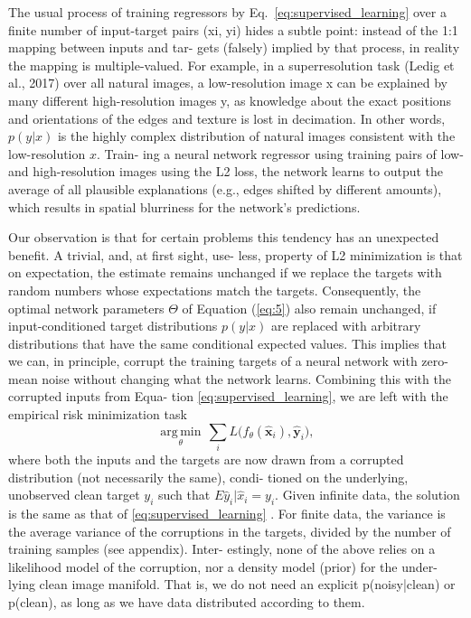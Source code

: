 The usual process of training regressors by
Eq.~\ref{eq:supervised_learning} over a finite number of input-target
pairs (xi, yi) hides a subtle point: instead of the 1:1 mapping
between inputs and tar- gets (falsely) implied by that process, in
reality the mapping is multiple-valued. For example, in a superresolution task
(Ledig et al., 2017) over all natural images, a low-resolution
image x can be explained by many different high-resolution
images y, as knowledge about the exact positions and orientations of the edges and texture is lost in decimation. In
other words, $p(y|x)$ is the highly complex distribution of
natural images consistent with the low-resolution $x$. Train-
ing a neural network regressor using training pairs of low-
and high-resolution images using the L2 loss, the network
learns to output the average of all plausible explanations
(e.g., edges shifted by different amounts), which results in
spatial blurriness for the network’s predictions.

Our observation is that for certain problems this tendency
has an unexpected benefit. A trivial, and, at first sight, use-
less, property of L2 minimization is that on expectation, the
estimate remains unchanged if we replace the targets with
random numbers whose expectations match the targets. Consequently, the
optimal network parameters $\Theta$ of Equation (\ref{eq:5}) also remain
unchanged, if input-conditioned target distributions $p(y|x)$
are replaced with arbitrary distributions that have the same
conditional expected values. This implies that we can, in
principle, corrupt the training targets of a neural network
with zero-mean noise without changing what the network
learns. Combining this with the corrupted inputs from Equa-
tion \ref{eq:supervised_learning}, we are left with the empirical risk minimization task
\begin{equation}
  \underset{\theta}{\operatorname{arg\,min}} \, \sum_i L \big(f_\theta(\hat{\mathbf x}_i), \hat{\mathbf y}_i\big),
\end{equation}
where both the inputs and the targets are now drawn from a corrupted
distribution (not necessarily the same), condi- tioned on the
underlying, unobserved clean target $y_i$ such that
$E{\hat{y}_i|\hat{x}_i} = y_i$. Given infinite data, the solution is
the same as that of \ref{eq:supervised_learning} . For finite data,
the variance is the average variance of the corruptions in the
targets, divided by the number of training samples (see
appendix). Inter- estingly, none of the above relies on a likelihood
model of the corruption, nor a density model (prior) for the under-
lying clean image manifold. That is, we do not need an explicit
p(noisy|clean) or p(clean), as long as we have data distributed
according to them.

